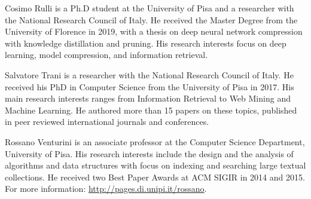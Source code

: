 \documentclass[journal,compsoc]{IEEEtran}
\begin{document}
\begin{IEEEbiography}{Cosimo Rulli}
is a Ph.D student at the University of Pisa and a researcher with the National Research Council of Italy. He received the Master Degree from the University of Florence in 2019, with a thesis on deep neural network compression with knowledge distillation and pruning. His research interests focus on deep learning, model compression, and information retrieval. 
\end{IEEEbiography}

\begin{IEEEbiography}{Salvatore Trani}
is a researcher with the National Research Council of Italy. He received his PhD in Computer Science from the University of Pisa in 2017. His main research interests ranges from Information Retrieval to Web Mining and Machine Learning. He authored more than 15 papers on these topics, published in peer reviewed international journals and  conferences.
\end{IEEEbiography}

\begin{IEEEbiography}{Rossano Venturini}
is an associate professor at the Computer Science Department, University of Pisa. His research interests include the design and the analysis of algorithms and data structures with focus on indexing and searching large textual collections. He received two Best Paper Awards at ACM SIGIR in 2014 and 2015. For more information: \href{http://pages.di.unipi.it/rossano}{http://pages.di.unipi.it/rossano}.
\end{IEEEbiography}
\end{document}
